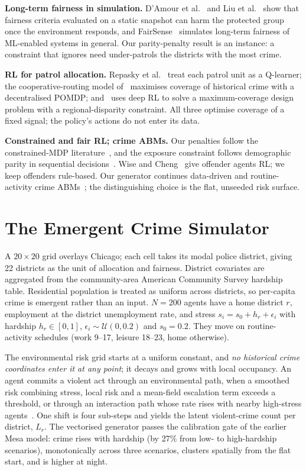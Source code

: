 \textbf{Long-term fairness in simulation.}
D'Amour et al.~\cite{damour2020} and Liu et al.~\cite{liu2018} show that
fairness criteria evaluated on a static snapshot can harm the protected group
once the environment responds, and FairSense~\cite{fairsense2025} simulates
long-term fairness of ML-enabled systems in general. Our parity-penalty result
is an instance: a constraint that ignores need under-patrols the districts with
the most crime.

\textbf{RL for patrol allocation.}
Repasky et al.~\cite{repasky2024} treat each patrol unit as a Q-learner; the
cooperative-routing model of~\cite{jocv2025} maximises coverage of historical
crime with a decentralised POMDP; and~\cite{ceus2025} uses deep RL to solve a
maximum-coverage design problem with a regional-disparity constraint. All three
optimise coverage of a fixed signal; the policy's actions do not enter its data.

\textbf{Constrained and fair RL; crime ABMs.}
Our penalties follow the constrained-MDP literature~\cite{chow2017,
tessler2019, stooke2020}, and the exposure constraint follows demographic parity
in sequential decisions~\cite{dwork2012, jabbari2017}. Wise and
Cheng~\cite{wise2024} give offender agents RL; we keep offenders rule-based.
Our generator continues data-driven and routine-activity crime
ABMs~\cite{roses2021, palma2025, caresim2023}; the distinguishing choice is the
flat, unseeded risk surface.

\section{The Emergent Crime Simulator}

A $20\times20$ grid overlays Chicago; each cell takes its modal police district,
giving 22 districts as the unit of allocation and fairness. District covariates
are aggregated from the community-area American Community Survey hardship table.
Residential population is treated as uniform across districts, so per-capita
crime is emergent rather than an input. $N=200$ agents have a home district $r$,
employment at the district unemployment rate, and stress
$s_i = s_0 + h_r + \epsilon_i$ with hardship $h_r\in[0,1]$,
$\epsilon_i\sim\mathcal{U}(0,0.2)$ and $s_0=0.2$. They move on routine-activity
schedules (work 9--17, leisure 18--23, home otherwise).

The environmental risk grid starts at a uniform constant, and \emph{no historical
crime coordinates enter it at any point}; it decays and grows with local
occupancy. An agent commits a violent act through an environmental path, when a
smoothed risk combining stress, local risk and a mean-field escalation term
exceeds a threshold, or through an interaction path whose rate rises with nearby
high-stress agents~\cite{roses2021}. One shift is four sub-steps and yields the
latent violent-crime count per district, $L_r$. The vectorised generator passes
the calibration gate of the earlier Mesa model: crime rises with hardship
(by 27\% from low- to high-hardship scenarios), monotonically across
three scenarios, clusters spatially from the flat start, and is higher at night.

